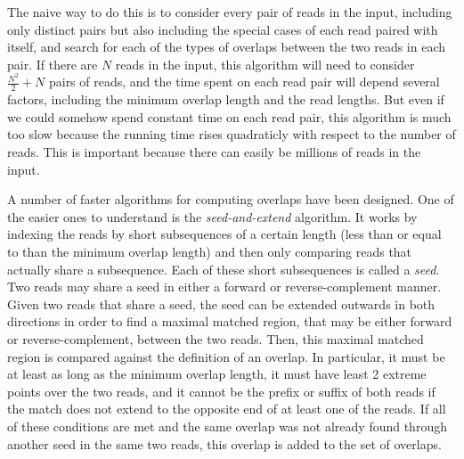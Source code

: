 \documentclass[10pt]{article}
\begin{document}
The naive way to do this is to consider every pair of reads in the input,
including only distinct pairs but also including the special cases of each read
paired with itself, and search for each of the types of overlaps between the two
reads in each pair.  If there are $N$ reads in the input, this algorithm will
need to consider $\frac{N^2}{2} + N$ pairs of reads, and the time spent on each
read pair will depend several factors, including the minimum overlap length and
the read lengths.  But even if we could somehow spend constant time on each read
pair, this algorithm is much too slow because the running time rises quadraticly
with respect to the number of reads.  This is important because there can easily
be millions of reads in the input.

A number of faster algorithms for computing overlaps have been designed.  One of
the easier ones to understand is the {\it seed-and-extend} algorithm.  It works
by indexing the reads by short subsequences of a certain length (less than or
equal to than the minimum overlap length) and then only comparing reads that
actually share a subsequence.  Each of these short subsequences is called a {\it
seed}.  Two reads may share a seed in either a forward or reverse-complement
manner.  Given two reads that share a seed, the seed can be extended outwards in
both directions in order to find a maximal matched region, that may be either
forward or reverse-complement, between the two reads.  Then, this maximal
matched region is compared against the definition of an overlap.  In particular,
it must be at least as long as the minimum overlap length, it must have least 2
extreme points over the two reads, and it cannot be the prefix or suffix of both
reads if the match does not extend to the opposite end of at least one of the
reads.  If all of these conditions are met and the same overlap was not already
found through another seed in the same two reads, this overlap is added to the
set of overlaps.
\end{document}
